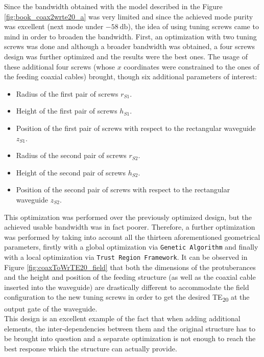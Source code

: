 \documentclass[english,twoside]{article}
\begin{document}
		Since the bandwidth obtained with the model described in the Figure \ref{fig:book_coax2wrte20_a} was very limited and since the achieved mode purity was excellent (next mode under $\SI{-58}{\decibel}$), the idea of using tuning screws came to mind in order to broaden the bandwidth. First, an optimization with two tuning screws was done and although a broader bandwidth was obtained, a four screws design was further optimized and the results were the best ones. The usage of these additional four screws (whose $x$ coordinates were constrained to the ones of the feeding coaxial cables) brought, though six additional parameters of interest:
		
		\begin{itemize}
			\item Radius of the first pair of screws $r_{S1}$.
			\item Height of the first pair of screws $h_{S1}$.
			\item Position of the first pair of screws with respect to the rectangular waveguide $z_{S1}$.
			\item Radius of the second pair of screws $r_{S2}$.
			\item Height of the second pair of screws $h_{S2}$.
			\item Position of the second pair of screws with respect to the rectangular waveguide $z_{S2}$.
		\end{itemize}
    
    This optimization was performed over the previously optimized design, but the achieved usable bandwidth was in fact poorer. Therefore, a further optimization was performed by taking into account all the  thirteen aforementioned geometrical parameters, firstly with a global optimization via \texttt{Genetic Algorithm} and finally with a local optimization via \texttt{Trust Region Framework}. It can be observed in Figure \ref{fig:coaxToWrTE20_field} that both the dimensions of the protuberances and the height and position of the feeding structure (as well as the coaxial cable inserted into the waveguide) are drastically different to accommodate the field configuration to the new tuning screws in order to get the desired TE\textsubscript{20} at the output gate of the waveguide.\\
    
    This design is an excellent example of the fact that when adding additional elements, the inter-dependencies between them and the original structure has to be brought into question and a separate optimization is not enough to reach the best response which the structure can actually provide.\\
	
\end{document}
